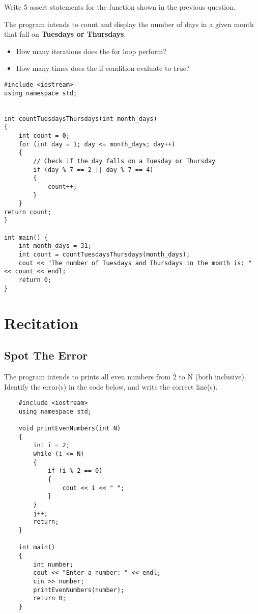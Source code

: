 \begin{problem}
    Write 5 assert statements for the function shown in the previous question.
\end{problem}

\begin{problem} The program intends to count and display the number of days in a given month that fall on \textbf{Tuesdays or Thursdays}.

\begin{itemize}
\item How many iterations does the for loop perform?
\item How many times does the if condition evaluate to true?
\end{itemize}

\begin{verbatim}
#include <iostream>
using namespace std;


int countTuesdaysThursdays(int month_days)
{
    int count = 0;
    for (int day = 1; day <= month_days; day++)
    {
        // Check if the day falls on a Tuesday or Thursday
        if (day % 7 == 2 || day % 7 == 4)
        {
            count++;
        }
    }
return count;
}

int main() {
    int month_days = 31;
    int count = countTuesdaysThursdays(month_days);
    cout << "The number of Tuesdays and Thursdays in the month is: " << count << endl;
    return 0;
}
\end{verbatim}
\end{problem}

\section{Recitation}

\subsection{Spot The Error}
\begin{multipart}
The program intends to prints all even numbers from 2 to N (both inclusive). Identify the error(s) in the code below, and write the correct line(s).
\end{multipart}

\begin{verbatim}
    #include <iostream>
    using namespace std;
    
    void printEvenNumbers(int N)
    {
        int i = 2;   
        while (i <= N)
        {
            if (i % 2 == 0)
            {
                cout << i << " ";
            }
        }
        j++;
        return;
    }
    
    int main()
    {
        int number;
        cout << "Enter a number: " << endl;
        cin >> number;
        printEvenNumbers(number);
        return 0;
    }
\end{verbatim}

